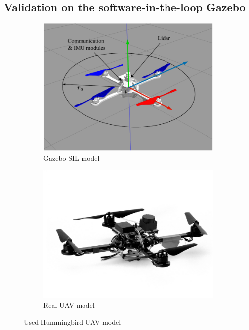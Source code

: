 \subsection{Validation on the software-in-the-loop Gazebo}
\begin{figure}[h!]
    \centering
    \begin{subfigure}[b]{0.45\textwidth}
    \includegraphics[width=\textwidth]{paper2/images/gazebo_uav.pdf}
    \caption{Gazebo SIL model}
    \label{fig:1gazebo_uav}
    \end{subfigure}
    \begin{subfigure}[b]{0.44\textwidth}
    \includegraphics[width=\textwidth]{paper2/images/hummingbird.pdf}
    \caption{Real UAV model \cite{Furrer2016,Bui2022}}
    \label{fig:1gazebo_real}
    \end{subfigure}
    \caption{Used Hummingbird UAV model}
    \label{fig:1gazebo_setup}
\end{figure}

